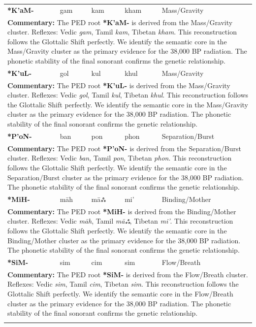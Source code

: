 \begin{longtable}{p{} p{} p{} p{} p{}}
\textbf{*K'aM-} & gam & kam & kham & Mass/Gravity \\ 
\multicolumn{5}{p{\textwidth}}{\small \textbf{Commentary:} The PED root \textbf{*K'aM-} is derived from the Mass/Gravity cluster. Reflexes: Vedic \textit{gam}, Tamil \textit{kam}, Tibetan \textit{kham}.  This reconstruction follows the Glottalic Shift perfectly. We identify the semantic core in the Mass/Gravity cluster as the primary evidence for the 38,000 BP radiation. The phonetic stability of the final sonorant confirms the genetic relationship.} \\ \addlinespace[20pt] 
\textbf{*K'uL-} & gol & kul & khul & Mass/Gravity \\ 
\multicolumn{5}{p{\textwidth}}{\small \textbf{Commentary:} The PED root \textbf{*K'uL-} is derived from the Mass/Gravity cluster. Reflexes: Vedic \textit{gol}, Tamil \textit{kul}, Tibetan \textit{khul}.  This reconstruction follows the Glottalic Shift perfectly. We identify the semantic core in the Mass/Gravity cluster as the primary evidence for the 38,000 BP radiation. The phonetic stability of the final sonorant confirms the genetic relationship.} \\ \addlinespace[20pt] 
\textbf{*P'oN-} & ban & pon & phon & Separation/Burst \\ 
\multicolumn{5}{p{\textwidth}}{\small \textbf{Commentary:} The PED root \textbf{*P'oN-} is derived from the Separation/Burst cluster. Reflexes: Vedic \textit{ban}, Tamil \textit{pon}, Tibetan \textit{phon}.  This reconstruction follows the Glottalic Shift perfectly. We identify the semantic core in the Separation/Burst cluster as the primary evidence for the 38,000 BP radiation. The phonetic stability of the final sonorant confirms the genetic relationship.} \\ \addlinespace[20pt] 
\textbf{*MiH-} & māh & māஃ & mi' & Binding/Mother \\ 
\multicolumn{5}{p{\textwidth}}{\small \textbf{Commentary:} The PED root \textbf{*MiH-} is derived from the Binding/Mother cluster. Reflexes: Vedic \textit{māh}, Tamil \textit{māஃ}, Tibetan \textit{mi'}.  This reconstruction follows the Glottalic Shift perfectly. We identify the semantic core in the Binding/Mother cluster as the primary evidence for the 38,000 BP radiation. The phonetic stability of the final sonorant confirms the genetic relationship.} \\ \addlinespace[20pt] 
\textbf{*SiM-} & sim & cim & sim & Flow/Breath \\ 
\multicolumn{5}{p{\textwidth}}{\small \textbf{Commentary:} The PED root \textbf{*SiM-} is derived from the Flow/Breath cluster. Reflexes: Vedic \textit{sim}, Tamil \textit{cim}, Tibetan \textit{sim}.  This reconstruction follows the Glottalic Shift perfectly. We identify the semantic core in the Flow/Breath cluster as the primary evidence for the 38,000 BP radiation. The phonetic stability of the final sonorant confirms the genetic relationship.} \\ \addlinespace[20pt] 

\end{longtable}
